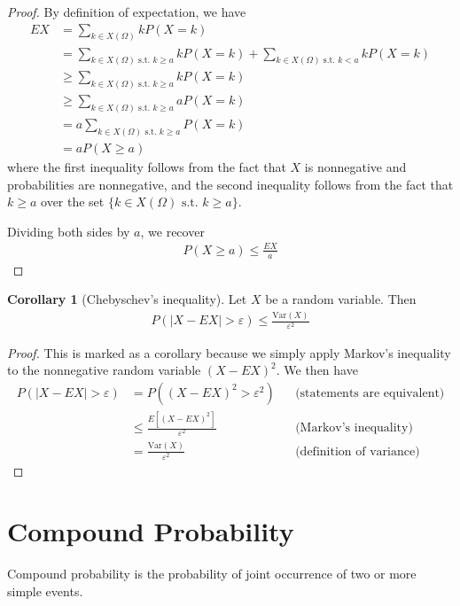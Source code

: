 \documentclass{tufte-book}
\newcommand\eps{\varepsilon}
\newcommand\var{\text{Var}}
\theoremstyle{definition}
\numberwithin{theorem}{section}
\numberwithin{definition}{section}
\numberwithin{lemma}{section}
\newtheorem{corollary}[theorem]{Corollary}
\numberwithin{corollary}{section}
\numberwithin{proposition}{section}
\numberwithin{remark}{section}
\numberwithin{claim}{section}
\numberwithin{observation}{section}
\numberwithin{fact}{section}
\numberwithin{assumption}{section}
\numberwithin{example}{section}
\numberwithin{exercise}{section}
\begin{document}
\begin{proof}
By definition of expectation, we have
\begin{align*}
EX &= \sum_{k \in X(\Omega)} k P(X = k) \\
&= \sum_{k \in X(\Omega)\text{ s.t. } k \geq a} k P(X = k) + \sum_{k \in X(\Omega)\text{ s.t. } k < a} k P(X = k) \\
&\geq \sum_{k \in X(\Omega)\text{ s.t. } k \geq a} k P(X = k) \\
&\geq \sum_{k \in X(\Omega)\text{ s.t. } k \geq a} a P(X = k) \\ 
&= a \sum_{k \in X(\Omega)\text{ s.t. } k \geq a}  P(X = k) \\ 
&= a P(X \geq a)
\end{align*}
where the first inequality follows from the fact that $X$ is nonnegative and probabilities are nonnegative, and the second inequality follows from the fact that $k \geq a$ over the set $\{k \in X(\Omega) \text{ s.t. } k \geq a\}$.

Dividing both sides by $a$, we recover
\begin{align*}
P(X \geq a) \leq \frac{EX}{a}
\end{align*}
\end{proof}

\begin{corollary}[Chebyschev's inequality]
Let $X$ be a random variable. Then
\begin{align*}
P(|X - EX| > \eps) \leq \frac{\var(X)}{\eps^2}
\end{align*}
\end{corollary}

\begin{proof}
This is marked as a corollary because we simply apply Markov's inequality to the nonnegative random variable $(X - EX)^2$. We then have
\begin{align*}
P(|X - EX| > \eps) &= P((X-EX)^2 > \eps^2) &&\text{(statements are equivalent)}\\
&\leq \frac{E[(X-EX)^2]}{\eps^2} &&\text{(Markov's inequality)} \\
&= \frac{\var(X)}{\eps^2} &&\text{(definition of variance)}
\end{align*}
\end{proof}


\chapter*{Compound Probability}
Compound probability is the probability of joint occurrence of two or more simple events.
\end{document}
